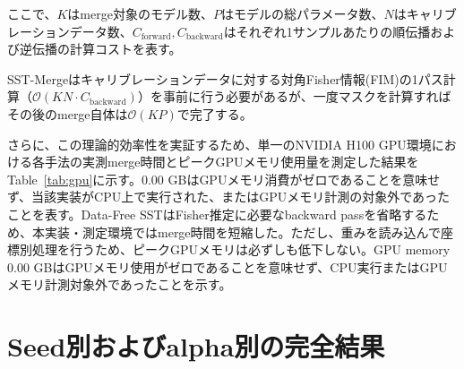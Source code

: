 \documentclass{article}
\begin{document}
ここで、$K$はmerge対象のモデル数、$P$はモデルの総パラメータ数、$N$はキャリブレーションデータ数、$C_{\text{forward}},C_{\text{backward}}$はそれぞれ1サンプルあたりの順伝播および逆伝播の計算コストを表す。

SST-Mergeはキャリブレーションデータに対する対角Fisher情報(FIM)の1パス計算（$\mathcal{O}(KN \cdot C_{\text{backward}})$）を事前に行う必要があるが、一度マスクを計算すればその後のmerge自体は$\mathcal{O}(KP)$で完了する。

さらに、この理論的効率性を実証するため、単一のNVIDIA H100 GPU環境における各手法の実測merge時間とピークGPUメモリ使用量を測定した結果をTable~\ref{tab:gpu}に示す。0.00 GBはGPUメモリ消費がゼロであることを意味せず、当該実装がCPU上で実行された、またはGPUメモリ計測の対象外であったことを表す。Data-Free SSTはFisher推定に必要なbackward passを省略するため、本実装・測定環境ではmerge時間を短縮した。ただし、重みを読み込んで座標別処理を行うため、ピークGPUメモリは必ずしも低下しない。GPU memory 0.00 GBはGPUメモリ使用がゼロであることを意味せず、CPU実行またはGPUメモリ計測対象外であったことを示す。

\begin{table}[H]
\centering
\caption{各マージ手法の実測マージ時間とピークGPUメモリ(平均)}
\label{tab:gpu}
\small
{}
\end{table}

\FloatBarrier

\section{Seed別およびalpha別の完全結果}
\label{sec:Seed別およびalpha別の完全結果}
\end{document}
